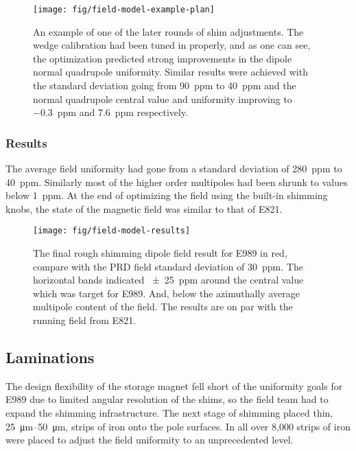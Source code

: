 \begin{figure}
\centering
\texttt{[image: fig/field-model-example-plan]}
\caption{
    An example of one of the later rounds of shim adjustments.  The wedge calibration had been tuned in properly, and as one can see, the optimization predicted strong improvements in the dipole normal quadrupole uniformity. Similar results were achieved with the standard deviation going from \SI{90}{ppm} to \SI{40}{ppm} and the normal quadrupole central value and uniformity improving to \SI{-0.3}{ppm} and \SI{7.6}{ppm} respectively.
    \label{fig:field-model-example-plan}
}
\end{figure}

\subsubsection{Results}

The average field uniformity had gone from a standard deviation of \SI{280}{ppm} to \SI{40}{ppm}.  Similarly most of the higher order multipoles had been shrunk to values below \SI{1}{ppm}.  At the end of optimizing the field using the built-in shimming knobs, the state of the magnetic field was similar to that of E821.  

\begin{figure}
\centering
\texttt{[image: fig/field-model-results]}
\caption{The final rough shimming dipole field result for E989 in red, compare with the PRD field standard deviation of \SI{30}{ppm}.  The horizontal bands indicated \SI{\pm 25}{ppm} around the central value which was target for E989.  And, below the azimuthally average multipole content of the field.  The results are on par with the running field from E821. \label{fig:field-model-results}}
\end{figure}

\subsection{Laminations}

The design flexibility of the storage magnet fell short of the uniformity goals for E989 due to limited angular resolution of the shims, so the field team had to expand the shimming infrastructure.  The next stage of shimming placed thin, \SIrange{25}{50}{\micro\meter}, strips of iron onto the pole surfaces.  In all over 8,000 strips of iron were placed to adjust the field uniformity to an unprecedented level.

